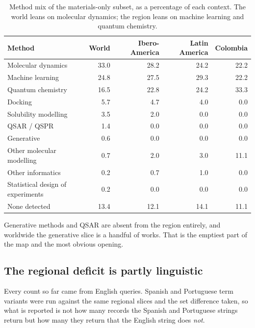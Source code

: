 \documentclass[11pt,a4paper]{article}
\begin{document}
\begin{table}[htbp]
\centering
\caption{Method mix of the materials-only subset, as a percentage of each context. The
world leans on molecular dynamics; the region leans on machine learning and quantum
chemistry.}
\label{tab:methods}
\small
\begin{tabular}{lrrrr}
\toprule
Method & World & Ibero-America & Latin America & Colombia \\
\midrule
Molecular dynamics & 33.0 & 28.2 & 24.2 & 22.2 \\
Machine learning & 24.8 & 27.5 & 29.3 & 22.2 \\
Quantum chemistry & 16.5 & 22.8 & 24.2 & 33.3 \\
Docking & 5.7 & 4.7 & 4.0 & 0.0 \\
Solubility modelling & 3.5 & 2.0 & 0.0 & 0.0 \\
QSAR / QSPR & 1.4 & 0.0 & 0.0 & 0.0 \\
Generative & 0.6 & 0.0 & 0.0 & 0.0 \\
Other molecular modelling & 0.7 & 2.0 & 3.0 & 11.1 \\
Other informatics & 0.2 & 0.7 & 1.0 & 0.0 \\
Statistical design of experiments & 0.2 & 0.0 & 0.0 & 0.0 \\
None detected & 13.4 & 12.1 & 14.1 & 11.1 \\
\bottomrule
\end{tabular}
\end{table}

Generative methods and QSAR are absent from the region entirely, and worldwide the
generative slice is a handful of works. That is the emptiest part of the map and the most
obvious opening.

\subsection{The regional deficit is partly linguistic}
\label{sec:language}

Every count so far came from English queries. Spanish and Portuguese term variants were run
against the same regional slices and the set difference taken, so what is reported is not
how many records the Spanish and Portuguese strings return but how many they return that
the English string does \emph{not}.
\end{document}
